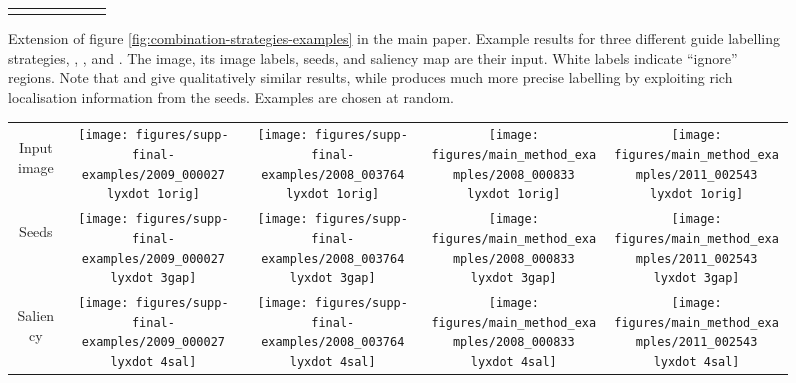 \documentclass[british,10pt,twocolumn,letterpaper]{article}
\providecommand{\tabularnewline}{\\}
\newcommand{\lyxdot}{.}
\begin{document}
\begin{figure*}
\begin{centering}
\begin{tabular}{ccccccc}
 &  &  &  &  &  & \tabularnewline
\end{tabular}
\par\end{centering}
\caption{\label{fig:guide-strategies}Extension of figure \ref{fig:combination-strategies-examples} in the main paper.
Example results for three different guide labelling strategies, ,
, and . The image, its image labels,
seeds, and saliency map are their input. White labels indicate ``ignore''
regions. Note that  and  give
qualitatively similar results, while  produces much
more precise labelling by exploiting rich localisation information
from the seeds. Examples are chosen at random.}
\end{figure*}

\begin{figure*}
\begin{centering}
\begin{tabular}{ccccc}
\begin{turn}{90}
Input image
\end{turn} & \texttt{[image: figures/supp-final-examples/2009\_000027\\lyxdot 1orig]} & \texttt{[image: figures/supp-final-examples/2008\_003764\\lyxdot 1orig]} & \texttt{[image: figures/main\_method\_examples/2008\_000833\\lyxdot 1orig]} & \texttt{[image: figures/main\_method\_examples/2011\_002543\\lyxdot 1orig]}\tabularnewline
\begin{turn}{90}
Seeds\hspace*{-3em}
\end{turn} & \texttt{[image: figures/supp-final-examples/2009\_000027\\lyxdot 3gap]} & \texttt{[image: figures/supp-final-examples/2008\_003764\\lyxdot 3gap]} & \texttt{[image: figures/main\_method\_examples/2008\_000833\\lyxdot 3gap]} & \texttt{[image: figures/main\_method\_examples/2011\_002543\\lyxdot 3gap]}\tabularnewline
\begin{turn}{90}
Saliency\hspace*{-3em}
\end{turn} & \texttt{[image: figures/supp-final-examples/2009\_000027\\lyxdot 4sal]} & \texttt{[image: figures/supp-final-examples/2008\_003764\\lyxdot 4sal]} & \texttt{[image: figures/main\_method\_examples/2008\_000833\\lyxdot 4sal]} & \texttt{[image: figures/main\_method\_examples/2011\_002543\\lyxdot 4sal]}\tabularnewline

\end{tabular}
\end{centering}
\end{figure*}
\end{document}
